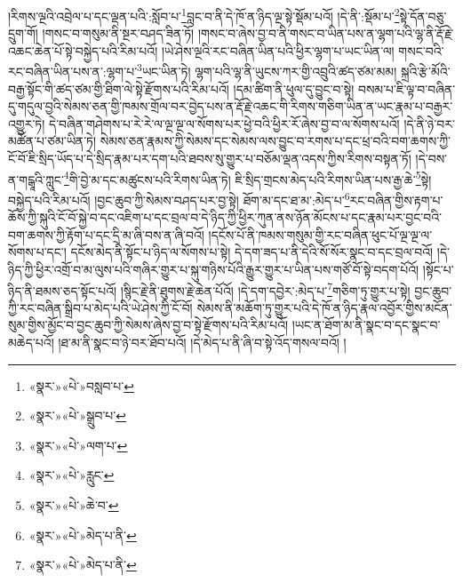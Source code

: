 །རིགས་ལྔའི་འབྲེལ་པ་དང་ལྡན་པའི་:སློབ་པ་\footnote{«སྣར་»«པེ་»བསླབ་པ་}བླང་བ་ནི་དེ་ཁོ་ན་ཉིད་ལྔ་སྟེ་སྡོམ་པའོ། །དེ་ནི་:སྡོམ་པ་\footnote{«སྣར་»«པེ་»སྒྲུབ་པ་}སྟེ་དོན་བཅུ་དྲུག་གོ། །གསང་བ་གསུམ་ནི་སྔར་བཤད་ཟིན་ཏོ། །གསང་བ་ཞེས་བྱ་བ་ནི་གསང་བ་ཡིན་པས་ན་ལྷག་པའི་ལྷ་ནི་རྡོ་རྗེ་འཆང་ཆེན་པོ་སྟེ་བསྐྱེད་པའི་རིམ་པའོ། །ཡེ་ཤེས་ལྔའི་རང་བཞིན་ཡིན་པའི་ཕྱིར་ལྷག་པ་ཡང་ཡིན་ལ། གསང་བའི་རང་བཞིན་ཡིན་པས་ན་:ལྷག་པ་\footnote{«སྣར་»«པེ་»ལག་པ་}ཡང་ཡིན་ཏེ། ལྷག་པའི་ལྷ་ནི་ཡུངས་ཀར་གྱི་འབྲུའི་ཚད་ཙམ་མམ། སྐྲའི་རྩེ་མོའི་བརྒྱ་སྟོང་གི་ཚད་ཙམ་གྱི་ཐིག་ལེ་སྟེ་རྫོགས་པའི་རིམ་པའོ། །དམ་ཚིག་ནི་ཕུལ་དུ་བྱུང་བ་སྟེ། བསམ་པ་ཇི་ལྟ་བ་བཞིན་དུ་གདུལ་བྱའི་སེམས་ཅན་གྱི་ཁམས་གྲོལ་བར་བྱེད་པས་ན་རྡོ་རྗེ་འཆང་གི་རིགས་གཅིག་ཡིན་ན་ཡང་རྣམ་པ་བརྒྱར་འགྱུར་ཏེ། དེ་བཞིན་གཤེགས་པ་རེ་རེ་ལ་ལྔ་ལྔ་ལ་སོགས་པར་ཕྱེ་བའི་ཕྱིར་རོ་ཞེས་བྱ་བ་ལ་སོགས་པའོ། །དེ་ནི་ཉེ་བར་མཚོན་པ་ཙམ་ཡིན་ཏེ། སེམས་ཅན་རྣམས་ཀྱི་སེམས་དང་སེམས་ལས་བྱུང་བ་རགས་པ་དང་ཕྲ་བའི་བག་ཆགས་ཀྱི་ངོ་བོ་ཇི་སྲིད་ཡོད་པ་དེ་སྲིད་རྣམ་པར་དག་པའི་ཐབས་སུ་གྱུར་པ་བཅོམ་ལྡན་འདས་ཀྱིས་རིགས་བསྟན་ཏོ། །དེ་བས་ན་གངྒཱའི་ཀླུང་\footnote{«སྣར་»«པེ་»རླུང་}གི་བྱེ་མ་དང་མཚུངས་པའི་རིགས་ཡིན་ཏེ། ཇི་སྲིད་གྲངས་མེད་པའི་རིགས་ཡིན་པས་རྒྱ་ཆེ་\footnote{«སྣར་»«པེ་»ཆེ་བ་}སྟེ། བསྐྱེད་པའི་རིམ་པའོ། །བྱང་ཆུབ་ཀྱི་སེམས་བཤད་པར་བྱ་སྟེ། ཐོག་མ་དང་ཐ་མ་:མེད་པ་\footnote{«སྣར་»«པེ་»མེད་པ་ནི་}རང་བཞིན་གྱིས་རྟག་པ་ཆོས་ཀྱི་སྐུའི་ངོ་བོ་སྐྱེ་བ་དང་འཇིག་པ་དང་བྲལ་བ་དེ་ཉིད་ཀྱི་ཕྱིར་ཀུན་ནས་ཉོན་མོངས་པ་དང་རྣམ་པར་བྱང་བའི་བག་ཆགས་ཀྱི་རྟོག་པ་དང་དྲི་མ་ཞི་བས་ན་ཞི་བའོ། །དངོས་པོ་ནི་ཁམས་གསུམ་གྱི་རང་བཞིན་ཕུང་པོ་ལྔ་ལྔ་ལ་སོགས་པ་དང་། དངོས་མེད་ནི་སྟོང་པ་ཉིད་ལ་སོགས་པ་སྟེ། དེ་དག་ཟད་པ་ནི་དེའི་སོ་སོར་སྣང་བ་དང་བྲལ་བའོ། །དེ་ཉིད་ཀྱི་ཕྱིར་འགྲོ་བ་མ་ལུས་པའི་གཞིར་གྱུར་པ་སྐུ་གཉིས་པོའི་རྒྱུར་གྱུར་པ་ཡིན་པས་གཙོ་བོ་སྟེ་བདག་པོའོ། །སྟོང་པ་ཉིད་ནི་ཐམས་ཅད་སྟོང་པའོ། །སྙིང་རྗེ་ནི་ཐུགས་རྗེ་ཆེན་པོའོ། །དེ་དག་དབྱེར་:མེད་པ་\footnote{«སྣར་»«པེ་»མེད་པ་ནི་}གཅིག་ཏུ་གྱུར་པ་སྟེ། བྱང་ཆུབ་ཀྱི་རང་བཞིན་སྒྲིབ་པ་མེད་པའི་ཡེ་ཤེས་ཀྱི་ངོ་བོ། སེམས་ནི་མཆོག་ཏུ་གྱུར་པའི་དེ་ཁོ་ན་ཉིད་རྣལ་འབྱོར་གྱིས་མངོན་སུམ་གྱིས་མྱོང་བ་བྱང་ཆུབ་ཀྱི་སེམས་ཞེས་བྱ་བ་སྟེ་རྫོགས་པའི་རིམ་པའོ། །ཡང་ན་ཐོག་མ་ནི་སྣང་བ་དང་སྣང་བ་མཆེད་པའོ། །ཐ་མ་ནི་སྣང་བ་ཉེ་བར་ཐོབ་པའོ། །དེ་མེད་པ་ནི་ཞི་བ་སྟེ་འོད་གསལ་བའོ། །
